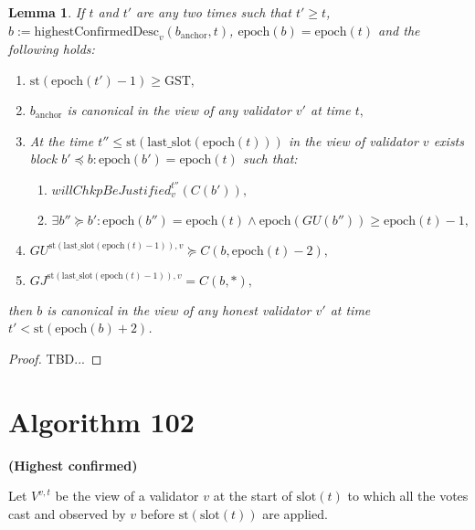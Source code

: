 \documentclass{article}
\newtheorem{lemma}{Lemma}
\begin{document}
\begin{lemma}
   If $t$ and $t'$ are any two times such that $t' \geq t$, $b := \text{highestConfirmedDesc}_v(b_{\text{anchor}}, t)$, $\text{epoch}(b) = \text{epoch}(t)$ and the following holds:
    
    \begin{enumerate}
        \item $\text{st}(\text{epoch}(t') - 1) \geq \text{GST},$
        \item $b_{\text{anchor}}$ is canonical in the view of any validator $v'$ at time $t,$
        \item At the time $t'' \leq \text{st}(\text{last\_slot}(\text{epoch}(t)))$ in the view of validator $v$ exists block $b' \preceq b : \text{epoch}(b') = \text{epoch}(t)$ such that:
        \begin{enumerate}
            \item $willChkpBeJustified^{t''}_v(C(b')),$
            \item $\exists b'' \succeq b' : \text{epoch}(b'') = \text{epoch}(t) \wedge \text{epoch}(GU(b'')) \geq \text{epoch}(t) - 1,$
        \end{enumerate}
        \item $GU^{\text{st}(\text{last\_slot}(\text{epoch}(t) - 1)),v} \succeq C(b, \text{epoch}(t) - 2),$
        \item $GJ^{\text{st}(\text{last\_slot}(\text{epoch}(t) - 1)),v} = C(b, *),$
    \end{enumerate}
    
    then $b$ is canonical in the view of any honest validator $v'$ at time $t' < \text{st}(\text{epoch}(b) + 2)$.
\end{lemma}

\begin{proof}
    TBD...
\end{proof}

\section*{Algorithm 102}
\textbf{(Highest confirmed)}

Let $V^{v,t}$ be the view of a validator $v$ at the start of $\text{slot}(t)$ to which all the votes cast and observed by $v$ before $\text{st}(\text{slot}(t))$ are applied.
\end{document}
